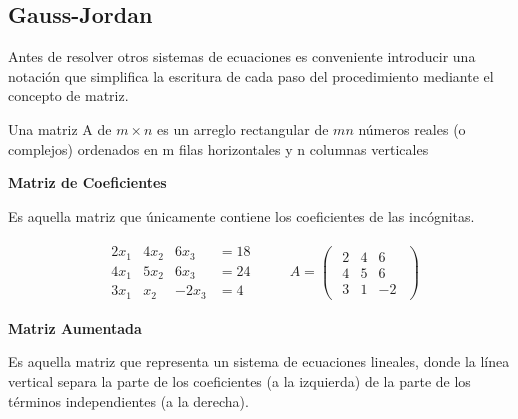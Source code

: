 \documentclass{article}
\begin{document}
\subsection{Gauss-Jordan}

Antes de resolver otros sistemas de ecuaciones es conveniente introducir una notación que simplifica la escritura de cada paso del procedimiento mediante el concepto de matriz.

\begin{tcolorbox}[colback=blue!10!white,colframe=blue!60!black,title=Definición]
    Una matriz A de $m \times n$ es un arreglo rectangular de $mn$ números reales (o complejos) ordenados en m filas horizontales y n columnas verticales
\end{tcolorbox}

\begin{large}
    \textbf{Matriz de Coeficientes}
\end{large}

Es aquella matriz que únicamente contiene los coeficientes de las incógnitas.

\begin{equation*}
    \begin{matrix}
        \begin{array}{rrrr}
            2x_1 & 4x_2 & 6x_3 &=18\\
            4x_1 & 5x_2 & 6x_3 &=24\\
            3x_1 & x_2  & -2x_3 &=4            
        \end{array}
    \end{matrix}
    \quad \quad A = \begin{pmatrix}
        \begin{array}{rrr}
            2 & 4 & 6 \\
            4 & 5 & 6 \\
            3 & 1 & -2         
        \end{array}    
    \end{pmatrix}
\end{equation*}

\begin{large}
    \textbf{Matriz Aumentada}
\end{large}

Es aquella matriz que representa un sistema de ecuaciones lineales, donde la línea vertical separa la parte de los coeficientes (a la izquierda) de la parte de los términos independientes (a la derecha).
\end{document}

